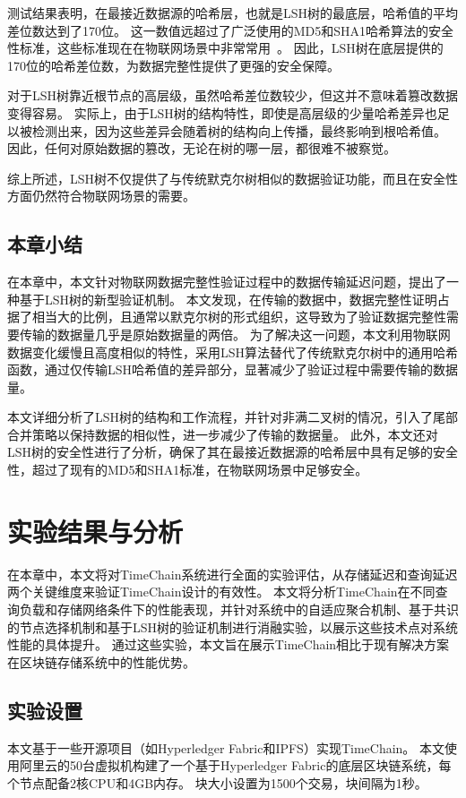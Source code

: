 测试结果表明，在最接近数据源的哈希层，也就是LSH树的最底层，哈希值的平均差位数达到了170位。
这一数值远超过了广泛使用的MD5和SHA1哈希算法的安全性标准，这些标准现在在物联网场景中非常常用~\cite{chi2017hashing,landge2018secured}。
因此，LSH树在底层提供的170位的哈希差位数，为数据完整性提供了更强的安全保障。

对于LSH树靠近根节点的高层级，虽然哈希差位数较少，但这并不意味着篡改数据变得容易。
实际上，由于LSH树的结构特性，即使是高层级的少量哈希差异也足以被检测出来，因为这些差异会随着树的结构向上传播，最终影响到根哈希值。
因此，任何对原始数据的篡改，无论在树的哪一层，都很难不被察觉。

综上所述，LSH树不仅提供了与传统默克尔树相似的数据验证功能，而且在安全性方面仍然符合物联网场景的需要。

\section{本章小结}
在本章中，本文针对物联网数据完整性验证过程中的数据传输延迟问题，提出了一种基于LSH树的新型验证机制。
本文发现，在传输的数据中，数据完整性证明占据了相当大的比例，且通常以默克尔树的形式组织，这导致为了验证数据完整性需要传输的数据量几乎是原始数据量的两倍。
为了解决这一问题，本文利用物联网数据变化缓慢且高度相似的特性，采用LSH算法替代了传统默克尔树中的通用哈希函数，通过仅传输LSH哈希值的差异部分，显著减少了验证过程中需要传输的数据量。

本文详细分析了LSH树的结构和工作流程，并针对非满二叉树的情况，引入了尾部合并策略以保持数据的相似性，进一步减少了传输的数据量。
此外，本文还对LSH树的安全性进行了分析，确保了其在最接近数据源的哈希层中具有足够的安全性，超过了现有的MD5和SHA1标准，在物联网场景中足够安全。

\chapter{实验结果与分析}
在本章中，本文将对TimeChain系统进行全面的实验评估，从存储延迟和查询延迟两个关键维度来验证TimeChain设计的有效性。
本文将分析TimeChain在不同查询负载和存储网络条件下的性能表现，并针对系统中的自适应聚合机制、基于共识的节点选择机制和基于LSH树的验证机制进行消融实验，以展示这些技术点对系统性能的具体提升。
通过这些实验，本文旨在展示TimeChain相比于现有解决方案在区块链存储系统中的性能优势。

\section{实验设置}
本文基于一些开源项目（如Hyperledger Fabric和IPFS）实现TimeChain。
本文使用阿里云的50台虚拟机构建了一个基于Hyperledger Fabric的底层区块链系统，每个节点配备2核CPU和4GB内存。
块大小设置为1500个交易，块间隔为1秒。

